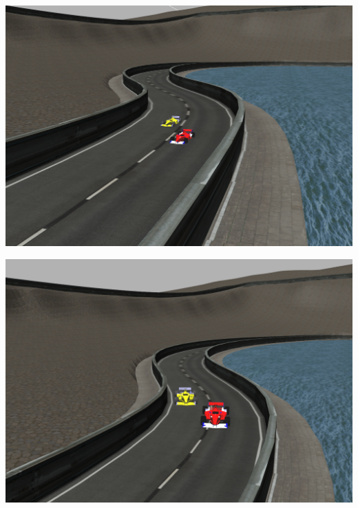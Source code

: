 \documentclass[notes,slidesec,a4]{seminar}
\begin{document}
\begin{hslide}
	\begin{minipage}{0.5\textwidth}
		\includegraphics[width=\textwidth]{MonacoElev07.png}
	\end{minipage}
	\begin{minipage}{0.5\textwidth}
		\includegraphics[width=\textwidth]{MonacoElev08.png}
	\end{minipage}
\end{hslide}
\end{document}
